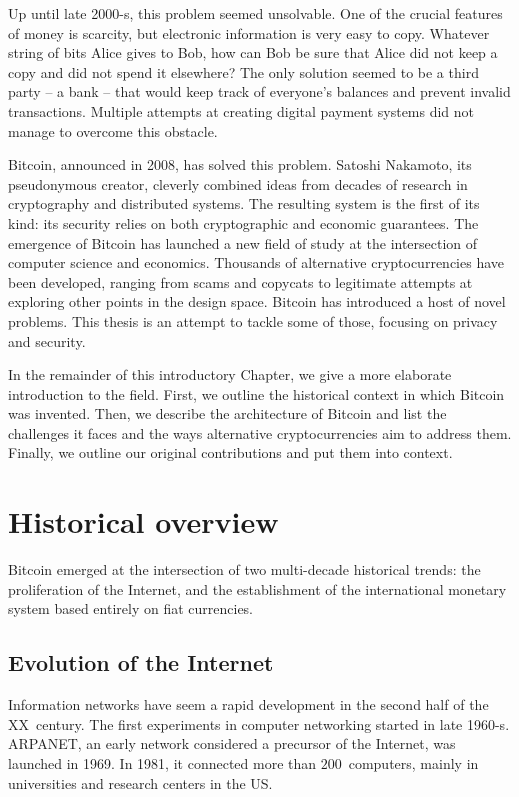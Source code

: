 Up until late 2000-s, this problem seemed unsolvable.
One of the crucial features of money is scarcity, but electronic information is very easy to copy.
Whatever string of bits Alice gives to Bob, how can Bob be sure that Alice did not keep a copy and did not spend it elsewhere?
The only solution seemed to be a third party -- a bank -- that would keep track of everyone's balances and prevent invalid transactions.
Multiple attempts at creating digital payment systems did not manage to overcome this obstacle.

Bitcoin, announced in 2008, has solved this problem.
Satoshi Nakamoto, its pseudonymous creator, cleverly combined ideas from decades of research in cryptography and distributed systems.
The resulting system is the first of its kind: its security relies on both cryptographic and economic guarantees.
The emergence of Bitcoin has launched a new field of study at the intersection of computer science and economics.
Thousands of alternative cryptocurrencies have been developed, ranging from scams and copycats to legitimate attempts at exploring other points in the design space.
Bitcoin has introduced a host of novel problems.
This thesis is an attempt to tackle some of those, focusing on privacy and security.

In the remainder of this introductory Chapter, we give a more elaborate introduction to the field.
First, we outline the historical context in which Bitcoin was invented.
Then, we describe the architecture of Bitcoin and list the challenges it faces and the ways alternative cryptocurrencies aim to address them.
Finally, we outline our original contributions and put them into context.


\section{Historical overview}

Bitcoin emerged at the intersection of two multi-decade historical trends: the proliferation of the Internet, and the establishment of the international monetary system based entirely on fiat currencies.


\subsection{Evolution of the Internet}

Information networks have seem a rapid development in the second half of the XX~century.
The first experiments in computer networking started in late 1960-s.
ARPANET, an early network considered a precursor of the Internet, was launched in 1969.
In 1981, it connected more than $200$~computers, mainly in universities and research centers in the US.

